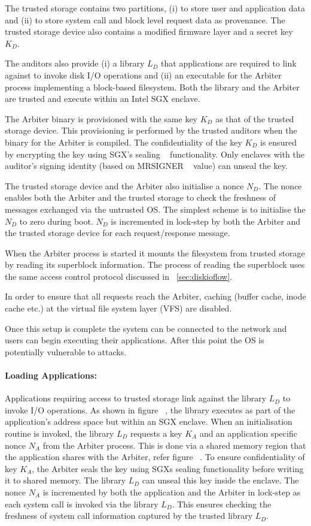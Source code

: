 \documentclass[withindex,glossary]{cam-thesis}
\begin{document}
The trusted storage contains two partitions,
(i) to store user and application data and
(ii) to store system call and block level request data as provenance.
The trusted storage device also contains a modified firmware layer and a secret key $K_D$.

The auditors also provide 
(i) a library $L_D$ that applications are required to link against to invoke disk I/O operations and
(ii) an executable for the Arbiter process implementing a block-based filesystem.
Both the library and the Arbiter are trusted and execute within an Intel SGX enclave.

The Arbiter binary is provisioned with the same key $K_D$ as that of the trusted storage device.
This provisioning is performed by the trusted auditors when the binary for the Arbiter is compiled.
The confidentiality of the key $K_D$ is ensured by encrypting the key using SGX's sealing ~\cite{sgxsealing} functionality.
Only enclaves with the auditor's signing identity (based on MRSIGNER ~\cite{mrsigner} value) can unseal the key.

The trusted storage device and the Arbiter also initialise a nonce $N_D$.
The nonce enables both the Arbiter and the trusted storage to check the freshness of messages exchanged via the untrusted OS.
The simplest scheme is to initialise the $N_D$ to zero during boot.
$N_D$ is incremented in lock-step by both the Arbiter and the trusted storage device for each request/response message.

When the Arbiter process is started it mounts the filesystem from trusted storage by reading its superblock information.
The process of reading the superblock uses the same access control protocol discussed in ~\ref{sec:diskioflow}.

In order to ensure that all requests reach the Arbiter, caching (buffer cache, inode cache etc.) at the virtual file system layer (VFS) are disabled.

Once this setup is complete the system can be connected to the network and users can begin executing their applications.
After this point the OS is potentially vulnerable to attacks.

\paragraph{Loading Applications:}
Applications requiring access to trusted storage link against the library $L_D$ to invoke I/O operations.
As shown in figure ~\cite{fig:noradhld}, the library executes as part of the application's address space but within an SGX enclave.
When an initialisation routine is invoked, the library $L_D$ requests a key $K_A$ and an application specific nonce $N_A$ from the Arbiter process.
This is done via a shared memory region that the application shares with the Arbiter, refer figure ~\cite{fig:noradhld}.
To ensure confidentiality of key $K_A$, the Arbiter seals the key using SGXs sealing functionality before writing it to shared memory.
The library $L_D$ can unseal this key inside the enclave.
The nonce $N_A$ is incremented by both the application and the Arbiter in lock-step as each system call is invoked via the library $L_D$.
This ensures checking the freshness of system call information captured by the trusted library $L_D$.
\end{document}
